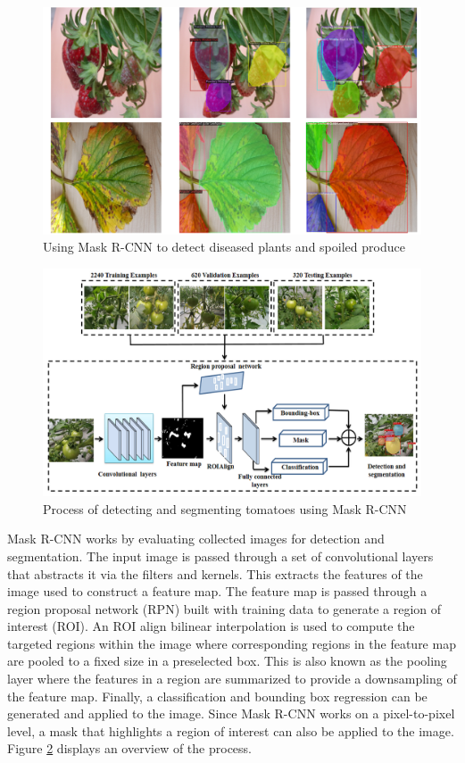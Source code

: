 \documentclass[12pt]{article}
\begin{document}
\begin{figure}[h]
\centering
\includegraphics[width=1.0\textwidth]{dp6.png}
\caption{Using Mask R-CNN to detect diseased plants and spoiled produce~\cite{afzaal2021instance}}
\label{fig:disease}
\end{figure}

\begin{figure}[h!]
\centering
\includegraphics[width=1.0\textwidth]{process.png}
\caption{Process of detecting and segmenting tomatoes using Mask R-CNN~\cite{zu2021detection}}
\label{fig:process}
\end{figure}

Mask R-CNN works by evaluating collected images for detection and segmentation. The input image is passed through a set of convolutional layers that abstracts it via the filters and kernels. This extracts the features of the image used to construct a feature map. The feature map is passed through a region proposal network (RPN) built with training data to generate a region of interest (ROI). An ROI align bilinear interpolation is used to compute the targeted regions within the image where corresponding regions in the feature map are pooled to a fixed size in a preselected box. This is also known as the pooling layer where the features in a region are summarized to provide a downsampling of the feature map. Finally, a classification and bounding box regression can be generated and applied to the image. Since Mask R-CNN works on a pixel-to-pixel level, a mask that highlights a region of interest can also be applied to the image. Figure \ref{fig:process} displays an overview of the process.
\end{document}
